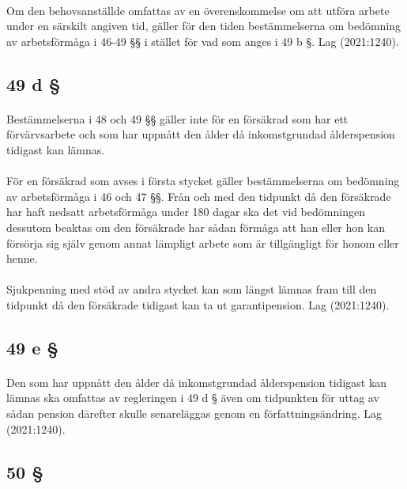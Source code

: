 \documentclass[a4paper,notitlepage,openany,10pt]{book}
\begin{document}
\paragraph*{}
Om den behovsanställde omfattas av en överenskommelse om att utföra arbete under en särskilt angiven tid, gäller för den tiden bestämmelserna om bedömning av arbetsförmåga i 46-49 §§ i stället för vad som anges i 49 b §.
Lag (2021:1240).
\subsection*{49 d §}
\paragraph*{}
Bestämmelserna i 48 och 49 §§ gäller inte för en försäkrad som har ett förvärvsarbete och som har uppnått den ålder då inkomstgrundad ålderspension tidigast kan lämnas.
\paragraph*{}
För en försäkrad som avses i första stycket gäller bestämmelserna om bedömning av arbetsförmåga i 46 och 47 §§. Från och med den tidpunkt då den försäkrade har haft nedsatt arbetsförmåga under 180 dagar ska det vid bedömningen dessutom beaktas om den försäkrade har sådan förmåga att han eller hon kan försörja sig själv genom annat lämpligt arbete som är tillgängligt för honom eller henne.
\paragraph*{}
Sjukpenning med stöd av andra stycket kan som längst lämnas fram till den tidpunkt då den försäkrade tidigast kan ta ut garantipension.
Lag (2021:1240).
\subsection*{49 e §}
\paragraph*{}
Den som har uppnått den ålder då inkomstgrundad ålderspension tidigast kan lämnas ska omfattas av regleringen i 49 d § även om tidpunkten för uttag av sådan pension därefter skulle senareläggas genom en författningsändring.
Lag (2021:1240).
\subsection*{50 §}
\end{document}
